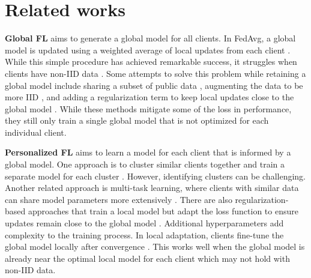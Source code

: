 \section{Related works}
\textbf{Global FL} aims to generate a global model for all clients. In FedAvg, a global model is updated using a weighted average of local updates from each client \cite{mcmahan2017communication}. While this simple procedure has achieved remarkable success, it struggles when clients have non-IID data \cite{li2020federated}. Some attempts to solve this problem while retaining a global model include sharing a subset of public data \cite{zhao2018federated}, augmenting the data to be more IID \cite{duan2019astraea}, and adding a regularization term to keep local updates close to the global model \cite{li2020federated}. While these methods mitigate some of the loss in performance, they still only train a single global model that is not optimized for each individual client.

\textbf{Personalized FL} aims to learn a model for each client that is informed by a global model. One approach is to cluster similar clients together and train a separate model for each cluster \cite{briggs2020federated, mansour2020three}. However, identifying clusters can be challenging. Another related approach is multi-task learning, where clients with similar data can share model parameters more extensively \cite{smith2017federated, dinh2021fedu}. There are also regularization-based approaches that train a local model but adapt the loss function to ensure updates remain close to the global model \cite{li2021ditto, t2020pfedme}. Additional hyperparameters add complexity to the training process. In local adaptation, clients fine-tune the global model locally after convergence \cite{yu2020salvaging}. This works well when the global model is already near the optimal local model for each client which may not hold with non-IID data.

